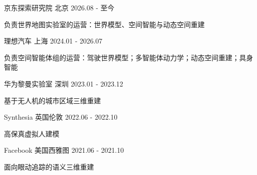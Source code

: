 


\begin{cventries}

{京东探索研究院} %
{北京} %
{2026.08 - 至今} %
{ %
\begin{cvitems}
\item {负责世界地图实验室的运营：世界模型、空间智能与动态空间重建}
\end{cvitems}
}

{理想汽车} %
{上海} %
{2024.01 - 2026.07} %
{ %
\begin{cvitems}
\item {负责空间智能体组的运营：驾驶世界模型；多智能体动力学；动态空间重建；具身智能}
\end{cvitems}
}

{华为黎曼实验室} %
{深圳} %
{2023.01 - 2023.12} %
{ %
\begin{cvitems}
\item {基于无人机的城市区域三维重建}
\end{cvitems}
}

{Synthesia} %
{英国伦敦} %
{2022.06 - 2022.10} %
{ %
\begin{cvitems}
\item {高保真虚拟人建模}
\end{cvitems}
}

{Facebook} %
{美国西雅图} %
{2021.06 - 2021.10} %
{ %
\begin{cvitems}
\item {面向眼动追踪的语义三维重建}
\end{cvitems}
}


\end{cventries}
